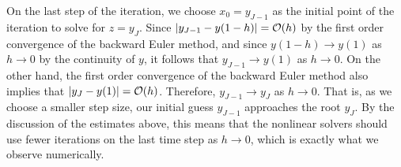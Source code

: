 \documentclass{homework}
\begin{document}
\begin{alphaparts}
		On the last step of the iteration, we choose $x_0 = y_{J-1}$ as the initial point of the iteration to solve for $z = y_J$. Since $|y_{J-1} - y(1-h)| = \mathcal{O}(h)$ by the first order convergence of the backward Euler method, and since $y(1-h) \to y(1)$ as $h\to 0$ by the continuity of $y$, it follows that $y_{J-1} \to y(1)$ as $h \to 0$. On the other hand, the first order convergence of the backward Euler method also implies that $|y_J - y(1)| = \mathcal{O}(h)$. Therefore, $y_{J-1} \to y_J$ as $h \to 0$. That is, as we choose a smaller step size, our initial guess $y_{J-1}$ approaches the root $y_J$. By the discussion of the estimates above, this means that the nonlinear solvers should use fewer iterations on the last time step as $h \to 0$, which is exactly what we observe numerically.
		\end{alphaparts}
		
\end{document}
